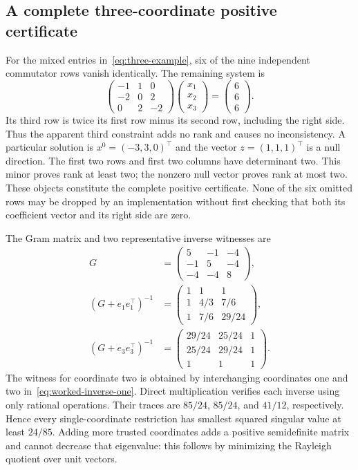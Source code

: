 \subsection{A complete three-coordinate positive certificate}
For the mixed entries in~\eqref{eq:three-example}, six of the nine independent commutator rows vanish identically. The remaining system is
\begin{equation}\label{eq:worked-matrix}
 \begin{pmatrix}-1&1&0\\-2&0&2\\0&2&-2\end{pmatrix}
 \begin{pmatrix}x_1\\x_2\\x_3\end{pmatrix}
 =\begin{pmatrix}6\\6\\6\end{pmatrix}.
\end{equation}
Its third row is twice its first row minus its second row, including the right side. Thus the apparent third constraint adds no rank and causes no inconsistency. A particular solution is $x^0=(-3,3,0)^\top$ and the vector $z=(1,1,1)^\top$ is a null direction. The first two rows and first two columns have determinant two. This minor proves rank at least two; the nonzero null vector proves rank at most two. These objects constitute the complete positive certificate. None of the six omitted rows may be dropped by an implementation without first checking that both its coefficient vector and its right side are zero.

The Gram matrix and two representative inverse witnesses are
\begin{align}
 G&=\begin{pmatrix}5&-1&-4\\-1&5&-4\\-4&-4&8\end{pmatrix},\label{eq:worked-gram}\\
 (G+e_1e_1^\top)^{-1}
 &=\begin{pmatrix}1&1&1\\1&4/3&7/6\\1&7/6&29/24\end{pmatrix},\label{eq:worked-inverse-one}\\
 (G+e_3e_3^\top)^{-1}
 &=\begin{pmatrix}29/24&25/24&1\\25/24&29/24&1\\1&1&1\end{pmatrix}.\label{eq:worked-inverse-three}
\end{align}
The witness for coordinate two is obtained by interchanging coordinates one and two in~\eqref{eq:worked-inverse-one}. Direct multiplication verifies each inverse using only rational operations. Their traces are $85/24$, $85/24$, and $41/12$, respectively. Hence every single-coordinate restriction has smallest squared singular value at least $24/85$. Adding more trusted coordinates adds a positive semidefinite matrix and cannot decrease that eigenvalue: this follows by minimizing the Rayleigh quotient over unit vectors.

